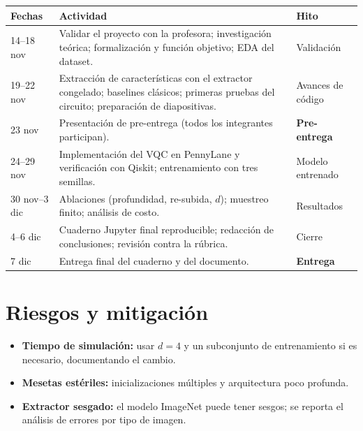 \documentclass[11pt,letterpaper]{article}
\begin{document}
\begin{table}[H]
\centering\small
\begin{tabular}{@{}p{3.3cm}p{8.9cm}p{2.3cm}@{}}
\toprule
Fechas & Actividad & Hito \\ \midrule
14--18 nov & Validar el proyecto con la profesora; investigación teórica; formalización y función
objetivo; EDA del dataset. & Validación \\
19--22 nov & Extracción de características con el extractor congelado; baselines clásicos; primeras
pruebas del circuito; preparación de diapositivas. & Avances de código \\
23 nov & Presentación de pre-entrega (todos los integrantes participan). & \textbf{Pre-entrega} \\
24--29 nov & Implementación del VQC en PennyLane y verificación con Qiskit; entrenamiento con
tres semillas. & Modelo entrenado \\
30 nov--3 dic & Ablaciones (profundidad, re-subida, $d$); muestreo finito; análisis de costo. & Resultados \\
4--6 dic & Cuaderno Jupyter final reproducible; redacción de conclusiones; revisión contra la rúbrica. & Cierre \\
7 dic & Entrega final del cuaderno y del documento. & \textbf{Entrega} \\
\bottomrule
\end{tabular}
\end{table}

\section{Riesgos y mitigación}
\begin{itemize}[leftmargin=*]
\item \textbf{Tiempo de simulación:} usar $d=4$ y un subconjunto de entrenamiento si es necesario,
documentando el cambio.
\item \textbf{Mesetas estériles:} inicializaciones múltiples y arquitectura poco profunda.
\item \textbf{Extractor sesgado:} el modelo ImageNet puede tener sesgos; se reporta el análisis de
errores por tipo de imagen.
\end{itemize}
\end{document}
